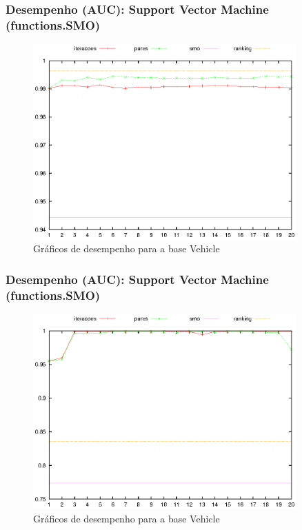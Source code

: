 \begin{frame}
    \frametitle{Desempenho (AUC): Support Vector Machine (functions.SMO)}

    \begin{figure}[H]
        \centering
        \includegraphics[width=0.9\textwidth]{img/vehicle_smo.eps}
        \caption{Gráficos de desempenho para a base Vehicle}
    \end{figure}
\end{frame}

\begin{frame}
    \frametitle{Desempenho (AUC): Support Vector Machine (functions.SMO)}

    \begin{figure}[H]
        \centering
        \includegraphics[width=0.9\textwidth]{img/yeast_smo.eps}
        \caption{Gráficos de desempenho para a base Vehicle}
    \end{figure}
\end{frame}